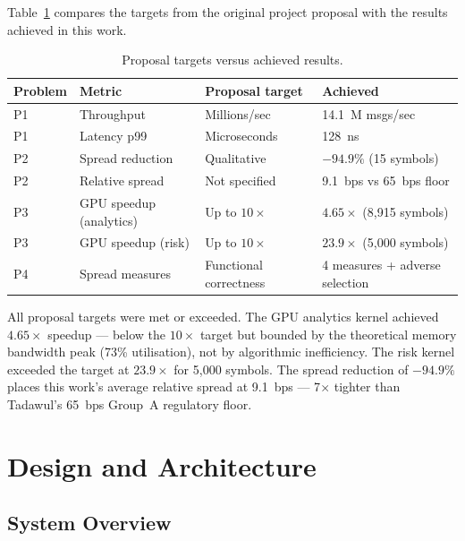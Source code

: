 \documentclass[12pt]{article}
\begin{document}
Table~\ref{tab:targets} compares the targets from the original project
proposal with the results achieved in this work.

\begin{table}[h]
\centering
\caption{Proposal targets versus achieved results.}
\label{tab:targets}
\begin{tabular}{@{}llll@{}}
\toprule
\textbf{Problem} & \textbf{Metric} & \textbf{Proposal target} & \textbf{Achieved} \\
\midrule
P1 & Throughput          & Millions/sec           & 14.1~M msgs/sec \\
P1 & Latency p99         & Microseconds           & 128~ns \\
P2 & Spread reduction    & Qualitative            & $-94.9\%$ (15 symbols) \\
P2 & Relative spread     & Not specified          & 9.1~bps vs 65~bps floor \\
P3 & GPU speedup (analytics) & Up to $10\times$   & $4.65\times$ (8{,}915 symbols) \\
P3 & GPU speedup (risk)  & Up to $10\times$       & $23.9\times$ (5{,}000 symbols) \\
P4 & Spread measures     & Functional correctness & 4 measures + adverse selection \\
\bottomrule
\end{tabular}
\end{table}

All proposal targets were met or exceeded. The GPU analytics kernel
achieved $4.65\times$ speedup --- below the $10\times$ target but bounded
by the theoretical memory bandwidth peak (73\% utilisation), not by
algorithmic inefficiency. The risk kernel exceeded the target at
$23.9\times$ for 5{,}000 symbols. The spread reduction of $-94.9\%$ places
this work's average relative spread at 9.1~bps --- 7$\times$ tighter than
Tadawul's 65~bps Group~A regulatory floor.

\newpage

\section{Design and Architecture}
\label{sec:design}

\subsection{System Overview}
\end{document}
